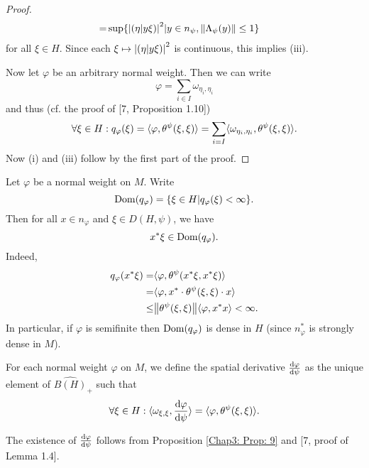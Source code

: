\begin{proof}
\[\begin{split}
            =&\sup\{\abs{(\eta|y\xi)}^2|y\in n_\psi,\norm{\Lambda_\psi(y)}\leq 1\}
        \end{split}
    \]
    for all $\xi\in H$. Since each $\xi\mapsto \abs{(\eta|y\xi)}^2$ is continuous, this implies (iii).\par
    Now let $\varphi$ be an arbitrary normal weight. Then we can write
    \[
        \varphi=\sum_{i\in I}\omega_{\eta_i,\eta_i}
    \]
    and thus (cf. the proof of [7, Proposition 1.10])
    \[
        \forall \xi\in H:  q_\varphi(\xi)=\langle\varphi,\theta^\psi(\xi,\xi)\rangle=\sum_{i=I}\langle\omega_{\eta_i,\eta_i},\theta^\psi(\xi,\xi)\rangle.
    \]
    Now (i) and (iii) follow by the first part of the proof.
\end{proof}
\begin{remark}
    Let $\varphi$ be a normal weight on $M$. Write
    \begin{equation}
        \operatorname{Dom}(q_\varphi)=\{\xi\in H|q_\varphi(\xi)<\infty\}.
    \end{equation}
    Then for all $x\in n_\varphi$ and $\xi\in D(H,\psi)$, we have
    \begin{equation}
        x^*\xi\in \operatorname{Dom}(q_\varphi).
    \end{equation}
    Indeed,
    \[
        \begin{split}
            q_\varphi(x^*\xi)=&\langle\varphi,\theta^\psi(x^*\xi,x^*\xi)\rangle\\
            =&\langle\varphi,x^*\cdot\theta^\psi(\xi,\xi)\cdot x\rangle\\
            \leq &\norm{\theta^\psi(\xi,\xi)}\langle\varphi,x^*x\rangle<\infty.
        \end{split}
    \]
    In particular, if $\varphi$ is semifinite then $\operatorname{Dom}(q_\varphi)$ is dense in $H$ (since $n_\varphi^*$ is strongly dense in $M$).
\end{remark}
\begin{definition}\label{Chap3: Def: 11}
    For each normal weight $\varphi$ on $M$, we define the spatial derivative $\dv{\varphi}{\psi}$ as the unique element of $\widehat{B(H)}_+$ such that
    \begin{equation}
        \forall \xi\in H: \langle\omega_{\xi,\xi},\dv{\varphi}{\psi}\rangle=\langle\varphi,\theta^\psi(\xi,\xi)\rangle.
    \end{equation}
\end{definition}
The existence of $\dv{\varphi}{\psi}$ follows from Proposition \ref{Chap3: Prop: 9} and [7, proof of Lemma 1.4].
